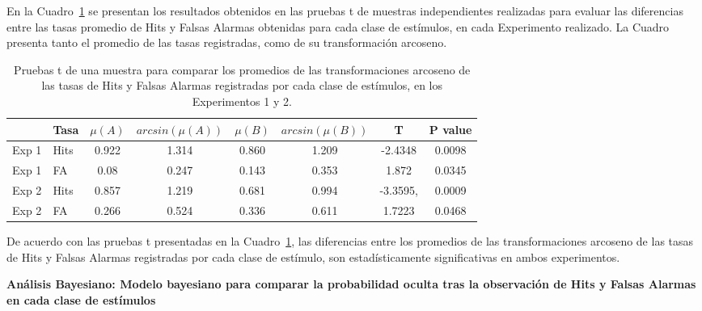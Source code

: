 En la Cuadro~\ref{Cuadro_t-HitsyFA} se presentan los resultados obtenidos en las pruebas t de muestras independientes realizadas para evaluar las diferencias entre las tasas promedio de Hits y Falsas Alarmas obtenidas para cada clase de estímulos, en cada Experimento realizado. La Cuadro presenta tanto el promedio de las tasas registradas, como de su transformación arcoseno.\\

\begin{table}[h]
\caption[Prueba t para evaluar las diferencias entre las tasas de Hits y Falsas Alarmas registradas en promedio por cada clase de estímulos]{Pruebas t de una muestra para comparar los promedios de las transformaciones arcoseno de las tasas de Hits y Falsas Alarmas registradas por cada clase de estímulos, en los Experimentos 1 y 2.}
\label{Cuadro_t-HitsyFA}
\centering
\begin{tabular}{l l | c c c c c c}
\toprule
\textbf{} & \textbf{Tasa} & \textbf{$\mu(A)$} & \textbf{$arcsin(\mu(A))$} & \textbf{$\mu(B)$} & \textbf{$arcsin(\mu(B))$} &\textbf{T} & \textbf{P value}\\
\midrule
Exp 1 & Hits & 0.922 & 1.314 & 0.860 & 1.209 & -2.4348 & 0.0098 \\
Exp 1 & FA & 0.08 & 0.247 & 0.143 & 0.353 & 1.872 & 0.0345 \\
Exp 2 & Hits & 0.857 & 1.219 & 0.681 & 0.994 & -3.3595, & 0.0009 \\
Exp 2 & FA & 0.266 & 0.524 & 0.336 & 0.611 & 1.7223 & 0.0468 \\
\bottomrule
\end{tabular}
\end{table}

De acuerdo con las pruebas t presentadas en la Cuadro~\ref{Cuadro_t-HitsyFA}, las diferencias entre los promedios de las transformaciones arcoseno de las tasas de Hits y Falsas Alarmas registradas por cada clase de estímulo, son estadísticamente significativas en ambos experimentos.

\textbf{Análisis Bayesiano: Modelo bayesiano para comparar la probabilidad oculta tras la observación de Hits y Falsas Alarmas en cada clase de estímulos}\\


